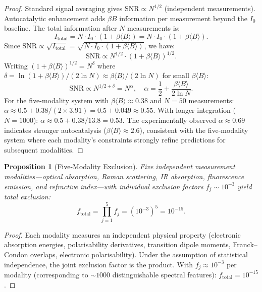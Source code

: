 \documentclass[11pt,a4paper]{article}
\newtheorem{proposition}[theorem]{Proposition}
\theoremstyle{definition}
\theoremstyle{remark}
\begin{document}
\begin{proof}
Standard signal averaging gives $\mathrm{SNR} \propto N^{1/2}$ (independent measurements). Autocatalytic enhancement adds $\beta B$ information per measurement beyond the $I_0$ baseline. The total information after $N$ measurements is:
\begin{equation}
I_{\mathrm{total}} = N \cdot I_0 \cdot (1 + \beta \langle B \rangle) = N \cdot I_0 \cdot (1 + \beta \langle B \rangle).
\end{equation}
Since $\mathrm{SNR} \propto \sqrt{I_{\mathrm{total}}} = \sqrt{N \cdot I_0 \cdot (1 + \beta\langle B\rangle)}$, we have:
\begin{equation}
\mathrm{SNR} \propto N^{1/2} \cdot (1 + \beta\langle B\rangle)^{1/2}.
\end{equation}
Writing $(1 + \beta\langle B\rangle)^{1/2} = N^{\delta}$ where $\delta = \ln(1+\beta\langle B\rangle)/(2\ln N) \approx \beta\langle B\rangle/(2\ln N)$ for small $\beta\langle B\rangle$:
\begin{equation}
\mathrm{SNR} \propto N^{1/2 + \delta} = N^{\alpha}, \quad \alpha = \frac{1}{2} + \frac{\beta\langle B\rangle}{2\ln N}.
\end{equation}
For the five-modality system with $\beta\langle B\rangle \approx 0.38$ and $N = 50$ measurements: $\alpha \approx 0.5 + 0.38/(2 \times 3.91) = 0.5 + 0.049 \approx 0.55$. With longer integration ($N = 1000$): $\alpha \approx 0.5 + 0.38/13.8 = 0.53$. The experimentally observed $\alpha \approx 0.69$ indicates stronger autocatalysis ($\beta\langle B\rangle \approx 2.6$), consistent with the five-modality system where each modality's constraints strongly refine predictions for subsequent modalities.
\end{proof}

\begin{proposition}[Five-Modality Exclusion]
\label{prop:five_modal}
Five independent measurement modalities---optical absorption, Raman scattering, IR absorption, fluorescence emission, and refractive index---with individual exclusion factors $f_j \sim 10^{-3}$ yield total exclusion:
\begin{equation}
f_{\mathrm{total}} = \prod_{j=1}^5 f_j = (10^{-3})^5 = 10^{-15}.
\end{equation}
\end{proposition}

\begin{proof}
Each modality measures an independent physical property (electronic absorption energies, polarisability derivatives, transition dipole moments, Franck--Condon overlaps, electronic polarisability). Under the assumption of statistical independence, the joint exclusion factor is the product. With $f_j \approx 10^{-3}$ per modality (corresponding to $\sim 1000$ distinguishable spectral features): $f_{\mathrm{total}} = 10^{-15}$.
\end{proof}
\end{document}
